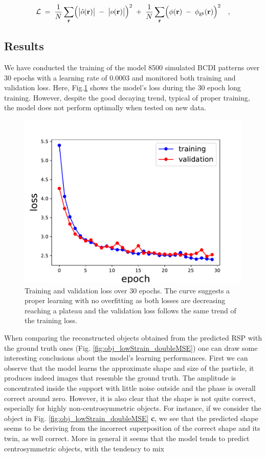 \begin{equation}
    \mathcal{L}
    \;=\;
    \frac{1}{N}\sum_{\mathbf{r}}
    \Bigl(\bigl|\hat{o}(\mathbf{r})\bigr|
        \;-\;\bigl|o(\mathbf{r})\bigr|\Bigr)^{2}
    \;+\;
    \frac{1}{N}\sum_{\mathbf{r}}
    \Bigl(\phi(\mathbf{r})
        \;-\;\phi_{\mathrm{gt}}(\mathbf{r})\Bigr)^{2}
    \quad,
    \label{eq:loss}
\end{equation}
\subsection{Results}
We have conducted the training of the model 8500 simulated BCDI patterns over 30 epochs with a learning rate of 0.0003
and monitored both training and validation loss. Here, Fig.\ref{fig:loss_2mse_nosymm} shows the model's loss during the 
30 epoch long training. However, despite the good decaying trend, typical of proper training, the model does not 
perform optimally when tested on new data. 

\begin{figure}[H]
    \centering
    \includegraphics[width=.8\textwidth]{figures/Phasing/loss_low_strain_noiseless_doubleMSE_nosymm.pdf}
    \caption{Training and validation loss over 30 epochs. The curve suggests a proper learning with no overfitting as 
    both losses are decreasing reaching a plateau and the validation loss follows the same trend of the training loss.}
    \label{fig:loss_2mse_nosymm}
\end{figure}

When comparing the reconstructed objects obtained from the predicted RSP with the ground truth ones (Fig. \ref{fig:obj_lowStrain_doubleMSE})
one can draw some interesting conclusions about the model's learning performances. 
First we can observe that the model learns the approximate shape and size of the particle, it produces indeed images 
that resemble the ground truth. The amplitude is concentrated inside the support with little noise outside and the phase 
is overall correct around zero. However, it is also clear that the shape is not quite correct, especially for highly 
non-centrosymmetric objects. For instance, if we consider the object in Fig. \ref{fig:obj_lowStrain_doubleMSE} \textbf{c}, 
we see that the predicted shape seems to be deriving from the incorrect superposition of the correct shape and its 
twin, as well correct. More in general it seems that the model tends to predict centrosymmetric objects, with the tendency
to mix  


